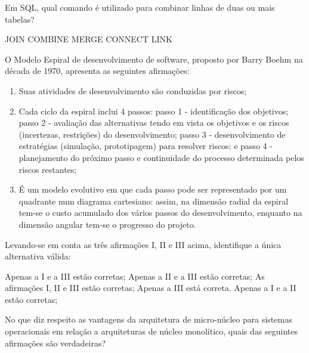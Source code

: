 \documentclass[12pt, addpoints]{exam}
\begin{document}
\begin{questions}
\question

Em SQL, qual comando é utilizado para combinar linhas de duas ou mais tabelas?


\begin{choices}
\choice JOIN
\choice COMBINE
\choice MERGE
\choice CONNECT
\choice LINK
\end{choices}

\question

O Modelo Espiral de desenvolvimento de software, proposto por Barry Boehm na década de 1970, apresenta as seguintes afirmações:

\begin{enumerate}[label=\Roman*.]

    \item Suas atividades de desenvolvimento são conduzidas por riscos;

    \item Cada ciclo da espiral inclui 4 passos: passo 1 - identificação dos objetivos; passo 2 - avaliação das alternativas tendo em vista os objetivos e os riscos (incertezas, restrições) do desenvolvimento; passo 3 - desenvolvimento de estratégias (simulação, prototipagem) para resolver riscos; e passo 4 - planejamento do próximo passo e continuidade do processo determinada pelos riscos restantes;

    \item É um modelo evolutivo em que cada passo pode ser representado por um quadrante num diagrama cartesiano: assim, na dimensão radial da espiral tem-se o custo acumulado dos vários passos do desenvolvimento, enquanto na dimensão angular tem-se o progresso do projeto.

\end{enumerate}

Levando-se em conta as três afirmações I, II e III acima, identifique a única alternativa válida:


\begin{choices}
\choice Apenas a I e a III estão corretas;
\choice Apenas a II e a III estão corretas;
\choice As afirmações I, II e III estão corretas;
\choice Apenas a III está correta.
\choice Apenas a I e a II estão corretas;
\end{choices}

\question

No que diz respeito as vantagens da arquitetura de micro-núcleo para sistemas operacionais em relação a arquiteturas de núcleo monolítico, quais das seguintes afirmações são verdadeiras?




\end{questions}
\end{document}
